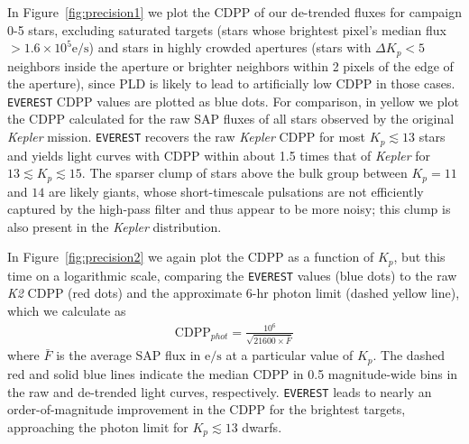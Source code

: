 \documentclass[]{emulateapj}
\begin{document}
In Figure~\ref{fig:precision1} we plot the CDPP of our de-trended fluxes for campaign 0-5 
stars, excluding saturated targets (stars whose brightest pixel's median flux $> 1.6\times 10^5 \mathrm{e/s}$) 
and stars in highly crowded apertures (stars with $\Delta K_p < 5$ neighbors
inside the aperture or brighter neighbors within 2 pixels of the edge of the aperture),
since PLD is likely to lead to artificially low CDPP in those cases. \texttt{EVEREST}
CDPP values are plotted as blue dots. For comparison, in yellow we plot the CDPP calculated for the raw
SAP fluxes of all stars observed by the original \emph{Kepler} mission. 
\texttt{EVEREST} recovers the raw \emph{Kepler} CDPP for most $K_p \lesssim 13$ stars
and yields light curves with CDPP within about 1.5 times that of \emph{Kepler}
for $13 \lesssim K_p \lesssim 15$. The sparser clump of stars above the bulk group between
$K_p = 11$ and $14$ are likely giants, whose short-timescale pulsations are not efficiently
captured by the high-pass filter and thus appear to be more noisy; this clump is also
present in the \emph{Kepler} distribution.

In Figure~\ref{fig:precision2} we again plot the CDPP as a function of $K_p$, but this time
on a logarithmic scale, comparing the \texttt{EVEREST} values (blue dots) to the raw \emph{K2}
CDPP (red dots) and the approximate 6-hr photon limit (dashed yellow line), which we calculate as
\begin{align}
\label{eq:phot}
\mathrm{CDPP}_{phot} = \frac{10^6}{\sqrt{21600\times\bar{F}}}
\end{align}
where $\bar{F}$ is the average SAP flux in $\mathrm{e/s}$ at a particular value of $K_p$. The dashed red
and solid blue lines indicate
the median CDPP in 0.5 magnitude-wide bins in the raw and de-trended light curves, respectively.
\texttt{EVEREST} leads to nearly an order-of-magnitude
improvement in the CDPP for the brightest targets, approaching the photon limit for 
$K_p \lesssim 13$ dwarfs.
\end{document}
